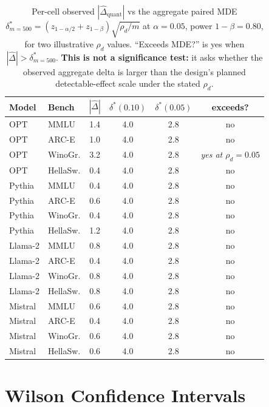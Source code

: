 \documentclass{article}
\begin{document}
\begin{table}[t]
\caption{Per-cell observed $|\hat\Delta_{\text{quant}}|$ vs the aggregate paired MDE $\delta^*_{m=500} = (z_{1-\alpha/2}+z_{1-\beta})\sqrt{\rho_d/m}$ at $\alpha{=}0.05$, power $1-\beta{=}0.80$, for two illustrative $\rho_d$ values. ``Exceeds MDE?'' is yes when $|\hat\Delta| > \delta^*_{m=500}$. \textbf{This is not a significance test:} it asks whether the observed aggregate delta is larger than the design's planned detectable-effect scale under the stated $\rho_d$.}
\label{tab:mdesens}
\centering
\footnotesize
\setlength{\tabcolsep}{4pt}
\begin{tabular}{llcccc}
\toprule
Model & Bench & $|\hat\Delta|$ & $\delta^*(0.10)$ & $\delta^*(0.05)$ & exceeds? \\
\midrule
OPT     & MMLU    & 1.4 & 4.0 & 2.8 & no \\
OPT     & ARC-E   & 1.0 & 4.0 & 2.8 & no \\
OPT     & WinoGr. & 3.2 & 4.0 & 2.8 & \emph{yes at $\rho_d{=}0.05$} \\
OPT     & HellaSw.& 0.4 & 4.0 & 2.8 & no \\
Pythia  & MMLU    & 0.4 & 4.0 & 2.8 & no \\
Pythia  & ARC-E   & 0.6 & 4.0 & 2.8 & no \\
Pythia  & WinoGr. & 0.4 & 4.0 & 2.8 & no \\
Pythia  & HellaSw.& 1.2 & 4.0 & 2.8 & no \\
Llama-2 & MMLU    & 0.8 & 4.0 & 2.8 & no \\
Llama-2 & ARC-E   & 0.4 & 4.0 & 2.8 & no \\
Llama-2 & WinoGr. & 0.8 & 4.0 & 2.8 & no \\
Llama-2 & HellaSw.& 0.8 & 4.0 & 2.8 & no \\
Mistral & MMLU    & 0.6 & 4.0 & 2.8 & no \\
Mistral & ARC-E   & 0.4 & 4.0 & 2.8 & no \\
Mistral & WinoGr. & 0.6 & 4.0 & 2.8 & no \\
Mistral & HellaSw.& 0.6 & 4.0 & 2.8 & no \\
\bottomrule
\end{tabular}
\end{table}

\section{Wilson Confidence Intervals}
\label{sec:cis}
\end{document}
